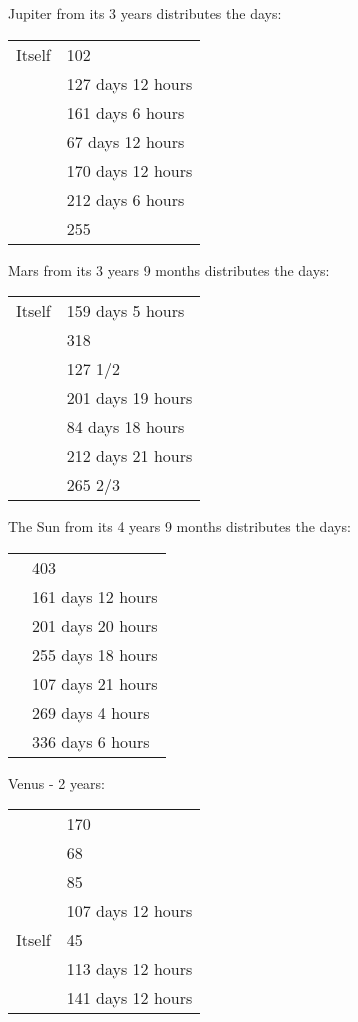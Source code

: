 Jupiter from its 3 years distributes the days:
\begin{center}
\begin{tabular}{cl}
Itself		& 102 \\
\Mars 		& 127 days 12 hours \\
\Sun 			& 161 days 6 hours \\
\Venus 		&  67 days 12 hours \\
\Mercury		& 170 days 12 hours \\
\Moon			& 212 days 6 hours \\
\Saturn		& 255 \\
\end{tabular}
\end{center}

Mars from its 3 years 9 months distributes the days:
\begin{center}
\begin{tabular}{cl}
Itself		& 159 days 5 hours \\
\Saturn		& 318 \\
\Jupiter		& 127 1/2 \\
\Sun 			& 201 days 19 hours \\
\Venus 		&  84 days 18 hours \\
\Mercury		& 212 days 21 hours \\
\Moon			& 265 2/3 \\
\end{tabular}
\end{center}
\newpage

The Sun from its 4 years 9 months distributes the days:
\begin{center}
\begin{tabular}{cl}
\Saturn		& 403 \\
\Jupiter		& 161 days 12 hours \\
\Mars 		& 201 days 20 hours \\
\Sun 			& 255 days 18 hours \\
\Venus 		& 107 days 21 hours \\
\Mercury		& 269 days 4 hours \\
\Moon			& 336 days 6 hours \\
\end{tabular}
\end{center}

Venus - 2 years:
\begin{center}
\begin{tabular}{cl}
\Saturn		& 170 \\
\Jupiter		&  68 \\
\Mars 		&  85  \\
\Sun 			& 107 days 12 hours \\
Itself		& 45 \\
\Mercury 	& 113 days 12 hours \\
\Moon			& 141 days 12 hours \\
\end{tabular}
\end{center}

